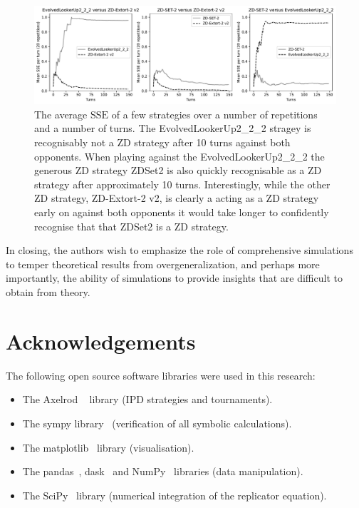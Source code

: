 \documentclass[a4paper]{article}
\newcommand{\SSe}{\text{SSE}}
\begin{document}
\begin{figure}[!htbp]
    \centering
    \includegraphics[width=.8\textwidth]{./assets/img/learning_sse/main.pdf}
    \caption{The average \(\SSe\) of a few strategies over a number of
    repetitions and a number of turns. The EvolvedLookerUp2\_2\_2 stragey is
    recognisably not a ZD strategy after 10 turns against both opponents.  When
    playing against the EvolvedLookerUp2\_2\_2 the generous ZD strategy ZDSet2
    is also quickly recognisable as a ZD strategy after approximately 10 turns.
    Interestingly, while the other ZD strategy, ZD-Extort-2 v2, is clearly a
    acting as a ZD strategy early on against both opponents it would take longer
    to confidently recognise that that ZDSet2 is a ZD strategy.
        }
    \label{fig:learning_sse}
\end{figure}

In closing, the authors wish to emphasize the role of comprehensive simulations to temper
theoretical results from overgeneralization, and perhaps more importantly, the
ability of simulations to provide insights that are difficult to obtain from theory.

\section*{Acknowledgements}

The following open source software libraries were used in this research:

\begin{itemize}
    \item The Axelrod ~\cite{Knight2016, Knight2018} library (IPD strategies and
        tournaments).
    \item The sympy library~\cite{Meurer2017} (verification of all symbolic
        calculations).
    \item The matplotlib~\cite{Droettboom2018} library (visualisation).
    \item The pandas~\cite{Structures2010}, dask~\cite{Dask2016} and
        NumPy~\cite{Oliphant2015} libraries (data manipulation).
    \item The SciPy~\cite{Jones2001} library (numerical integration of the
        replicator equation).
\end{itemize}
\end{document}
